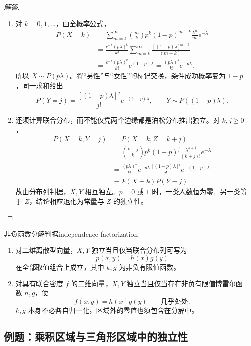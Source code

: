 \begin{proof}[解答]
\begin{enumerate}
\item 对 $k=0,1,\ldots$，由全概率公式，
\begin{align*}
P(X=k)
&=\sum_{m=k}^{\infty}\binom mkp^k(1-p)^{m-k}
 \frac{\lambda^m}{m!}e^{-\lambda}\\
&=\frac{e^{-\lambda}(p\lambda)^k}{k!}
 \sum_{m=k}^{\infty}\frac{[(1-p)\lambda]^{m-k}}{(m-k)!}\\
&=\frac{e^{-\lambda}(p\lambda)^k}{k!}e^{(1-p)\lambda}
=\frac{(p\lambda)^k}{k!}e^{-p\lambda}.
\end{align*}
所以 $X\sim P(p\lambda)$。将“男性”与“女性”的标记交换，条件成功概率变为 $1-p$，同一求和给出
\[
P(Y=j)=\frac{[(1-p)\lambda]^j}{j!}e^{-(1-p)\lambda},
\qquad Y\sim P((1-p)\lambda).
\]

\item 还须计算联合分布，而不能仅凭两个边缘都是泊松分布推出独立。对 $k,j\geq0$，
\begin{align*}
P(X=k,Y=j)
&=P(X=k,Z=k+j)\\
&=\binom{k+j}{k}p^k(1-p)^j
  \frac{\lambda^{k+j}}{(k+j)!}e^{-\lambda}\\
&=\frac{(p\lambda)^k}{k!}e^{-p\lambda}
  \frac{[(1-p)\lambda]^j}{j!}e^{-(1-p)\lambda}\\
&=P(X=k)P(Y=j).
\end{align*}
故由分布列判据，$X,Y$ 相互独立。$p=0$ 或 $1$ 时，一类人数恒为零，另一类等于 $Z$，结论相应退化为常量与 $Z$ 的独立性。
\end{enumerate}
\end{proof}

\begin{proposition}{非负函数分解判据}{independence-factorization}
\begin{enumerate}
\item 对二维离散型向量，$X,Y$ 独立当且仅当联合分布列可写为
\[
p(x,y)=h(x)g(y)
\]
在全部取值组合上成立，其中 $h,g$ 为非负有限值函数。
\item 对具有联合密度 $f$ 的二维向量，$X,Y$ 独立当且仅当存在非负有限值博雷尔函数 $h,g$，使
\[
f(x,y)=h(x)g(y)\qquad\text{几乎处处}.
\]
$h,g$ 本身不必各自归一化。区域外的零值也须包含在分解中。
\end{enumerate}
\end{proposition}

\subsection{例题：乘积区域与三角形区域中的独立性}\label{note:c3:e8}
